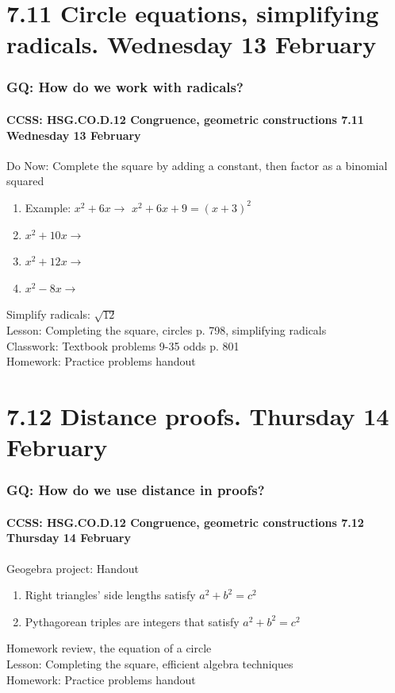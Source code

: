 \documentclass{beamer}
\begin{document}
\section{7.11 Circle equations, simplifying radicals. Wednesday 13 February}
  \frame
  {
    \frametitle{GQ: How do we work with radicals?}
    \framesubtitle{CCSS: HSG.CO.D.12 Congruence, geometric constructions \hfill \alert{7.11 Wednesday 13 February}}

    \begin{block}{Do Now: Complete the square by adding a constant, then factor as a binomial squared}
      \begin{enumerate}
        \item Example: $x^2+6x \rightarrow$ \qquad $x^2+6x+9=(x+3)^2$
        \item $x^2+10x \rightarrow$
        \item $x^2+12x \rightarrow$
        \item $x^2-8x \rightarrow$
      \end{enumerate}
    \end{block}
    Simplify radicals: $\sqrt{12}$\\
    Lesson: Completing the square, circles p. 798, simplifying radicals\\
    Classwork: Textbook problems 9-35 odds p. 801\\[0.5cm]
    Homework: Practice problems handout
  }

\section{7.12 Distance proofs. Thursday 14 February}
  \frame
  {
    \frametitle{GQ: How do we use distance in proofs?}
    \framesubtitle{CCSS: HSG.CO.D.12 Congruence, geometric constructions \hfill \alert{7.12 Thursday 14 February}}

    \begin{block}{Geogebra project: Handout}
      \begin{enumerate}
        \item Right triangles' side lengths satisfy $a^2+b^2=c^2$
        \item Pythagorean triples are integers that satisfy $a^2+b^2=c^2$
      \end{enumerate}
    \end{block}
    Homework review, the equation of a circle\\
    Lesson: Completing the square, efficient algebra techniques\\[0.5cm]
    Homework: Practice problems handout
  }
\end{document}

